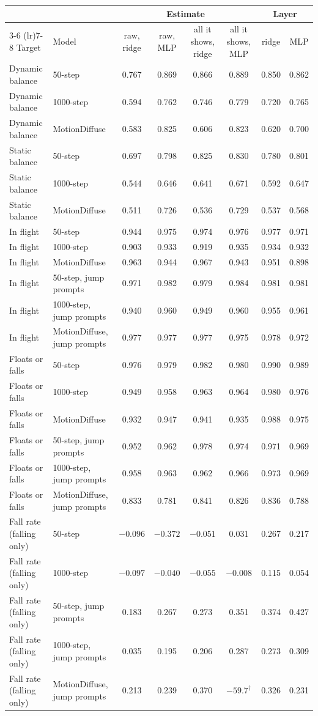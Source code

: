 \begin{tabular}{llcccccc}
\toprule
& & \multicolumn{4}{c}{Estimate} & \multicolumn{2}{c}{Layer} \\
\cmidrule(lr){3-6} \cmidrule(lr){7-8}
Target & Model & raw, ridge & raw, MLP & all it shows, ridge & all it shows, MLP & ridge & MLP \\
\midrule
Dynamic balance & 50-step & 0.767 & 0.869 & 0.866 & 0.889 & 0.850 & 0.862 \\
Dynamic balance & 1000-step & 0.594 & 0.762 & 0.746 & 0.779 & 0.720 & 0.765 \\
Dynamic balance & MotionDiffuse & 0.583 & 0.825 & 0.606 & 0.823 & 0.620 & 0.700 \\
Static balance & 50-step & 0.697 & 0.798 & 0.825 & 0.830 & 0.780 & 0.801 \\
Static balance & 1000-step & 0.544 & 0.646 & 0.641 & 0.671 & 0.592 & 0.647 \\
Static balance & MotionDiffuse & 0.511 & 0.726 & 0.536 & 0.729 & 0.537 & 0.568 \\
In flight & 50-step & 0.944 & 0.975 & 0.974 & 0.976 & 0.977 & 0.971 \\
In flight & 1000-step & 0.903 & 0.933 & 0.919 & 0.935 & 0.934 & 0.932 \\
In flight & MotionDiffuse & 0.963 & 0.944 & 0.967 & 0.943 & 0.951 & 0.898 \\
In flight & 50-step, jump prompts & 0.971 & 0.982 & 0.979 & 0.984 & 0.981 & 0.981 \\
In flight & 1000-step, jump prompts & 0.940 & 0.960 & 0.949 & 0.960 & 0.955 & 0.961 \\
In flight & MotionDiffuse, jump prompts & 0.977 & 0.977 & 0.977 & 0.975 & 0.978 & 0.972 \\
Floats or falls & 50-step & 0.976 & 0.979 & 0.982 & 0.980 & 0.990 & 0.989 \\
Floats or falls & 1000-step & 0.949 & 0.958 & 0.963 & 0.964 & 0.980 & 0.976 \\
Floats or falls & MotionDiffuse & 0.932 & 0.947 & 0.941 & 0.935 & 0.988 & 0.975 \\
Floats or falls & 50-step, jump prompts & 0.952 & 0.962 & 0.978 & 0.974 & 0.971 & 0.969 \\
Floats or falls & 1000-step, jump prompts & 0.958 & 0.963 & 0.962 & 0.966 & 0.973 & 0.969 \\
Floats or falls & MotionDiffuse, jump prompts & 0.833 & 0.781 & 0.841 & 0.826 & 0.836 & 0.788 \\
Fall rate (falling only) & 50-step & $-0.096$ & $-0.372$ & $-0.051$ & 0.031 & 0.267 & 0.217 \\
Fall rate (falling only) & 1000-step & $-0.097$ & $-0.040$ & $-0.055$ & $-0.008$ & 0.115 & 0.054 \\
Fall rate (falling only) & 50-step, jump prompts & 0.183 & 0.267 & 0.273 & 0.351 & 0.374 & 0.427 \\
Fall rate (falling only) & 1000-step, jump prompts & 0.035 & 0.195 & 0.206 & 0.287 & 0.273 & 0.309 \\
Fall rate (falling only) & MotionDiffuse, jump prompts & 0.213 & 0.239 & 0.370 & $-59.7^\dagger$ & 0.326 & 0.231 \\
\bottomrule
\end{tabular}
